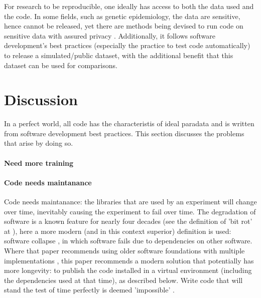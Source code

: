 For research to be reproducible, one ideally has access to
both the data used and the code.
In some fields, such as genetic epidemiology, the data are
sensitive, hence cannot be released,
yet there are methods being devised to run code on sensitive
data with assured privacy \cite{zhang2016review,azencott2018machine}.
Additionally, it follows software development's best practices 
(especially the practice to test code automatically) 
to release a simulated/public dataset, with
the additional benefit that this dataset can be used for comparisons.

\section{Discussion}

In a perfect world, all code has the characteristis of ideal paradata
and is written from software development best practices.
This section discusses the problems that arise by doing so.

\paragraph{Need more training}



\paragraph{Code needs maintanance}

Code needs maintanance:
the libraries that are used by an experiment
will change over time, inevitably causing the experiment to fail
over time. 
The degradation of software is a known feature for nearly 
four decades (see the definition of 'bit rot' at \cite{steele1983hacker}),
here a more modern (and in this context superior)
definition is used: software collapse \cite{hinsen2019dealing},
in which software fails due to dependencies on other 
software.
Where that paper recommends using older software foundations 
with multiple implementations \cite{hinsen2019dealing},
this paper recommends a modern solution that potentially has more 
longevity:
to publish the code installed in a virtual environment
(including the dependencies used at that time), as described below.
Write code that will stand the test of time perfectly
is deemed 'impossible' \cite{benureau2018re}.

